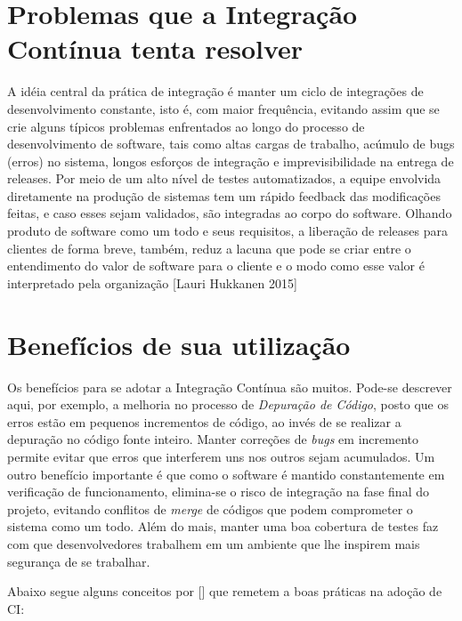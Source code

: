 \documentclass[11pt,oneside]{book}
\begin{document}
\section{Problemas que a Integração Contínua tenta resolver}

A idéia central da prática de integração é manter um ciclo de integrações de desenvolvimento constante, isto é, com maior frequência, evitando assim que se crie alguns típicos problemas enfrentados ao longo do processo de desenvolvimento de software, tais como altas cargas de trabalho, acúmulo de bugs (erros) no sistema, longos esforços de integração e imprevisibilidade na entrega de releases. Por meio de um alto nível de testes automatizados, a equipe envolvida diretamente na produção de sistemas tem um rápido feedback das modificações feitas, e caso esses sejam validados, são integradas ao corpo do software. Olhando produto de software como um todo e seus requisitos, a liberação de releases para clientes de forma breve, também, reduz a lacuna que pode se criar entre o entendimento do valor de software para o cliente e o modo como esse valor é interpretado pela organização [Lauri Hukkanen 2015]  

\section{Benefícios de sua utilização}

Os benefícios para se adotar a Integração Contínua são muitos. Pode-se descrever aqui, por exemplo, a melhoria no processo de \emph{Depuração de Código}, posto que os erros estão em pequenos incrementos de código, ao invés de se realizar a depuração no código fonte inteiro. Manter correções de \emph{bugs} em incremento permite evitar que erros que interferem uns nos outros sejam acumulados. Um outro benefício importante é que como o software é mantido constantemente em verificação de funcionamento, elimina-se o risco de integração na fase final do projeto, evitando conflitos de \emph{merge} de códigos que podem comprometer o sistema como um todo. Além do mais, manter uma boa cobertura de testes faz com que desenvolvedores trabalhem em um ambiente que lhe inspirem mais segurança de se trabalhar. 

Abaixo segue alguns conceitos por [] que remetem a boas práticas na adoção de CI:
\end{document}
